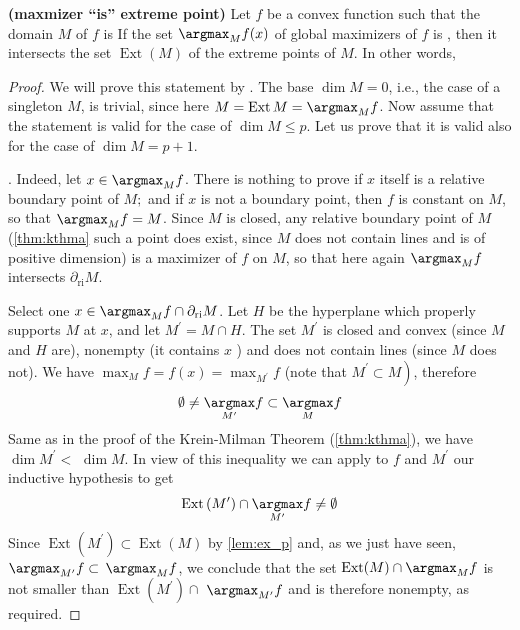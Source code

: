 \documentclass{article}
\newcommand{\bfs}[1]{\textbf{({#1}) }}
\newcommand{\rb}{\partial_{\mathrm{ri}}}
\begin{document}
\begin{thma}\bfs{maxmizer ``is'' extreme point}
Let $f$ be a convex function such that the domain $M$ of $f$ is  If the set $\argmax_M f(x)$ of global maximizers of $f$ is , then it intersects the set $\operatorname{Ext}(M)$ of the extreme points of $M$. In other words, 
\end{thma}
\begin{proof}\color{ForestGreen}
We will prove this statement by . The base $\operatorname{dim} M=0$, i.e., the case of a singleton $M$, is trivial, since here $M=\operatorname{Ext} M=\argmax_{M} f$. Now assume that the statement is valid for the case of $\operatorname{dim} M \leq p$. Let us prove that it is valid also for the case of $\operatorname{dim} M=p+1$.

\tb{We first verify that the set $\argmax_{M} f\cap \rb M\ne\emptyset$}. Indeed, let $x \in \argmax_{M} f$. There is nothing to prove if $x$ itself is a relative boundary point of $M ;$ and if $x$ is not a boundary point, then $f$ is constant on $M$, so that $\argmax_{M} f=M$. Since $M$ is closed, any relative boundary point of $M$ (\cref{thm:kthma} such a point does exist, since $M$ does not contain lines and is of positive dimension) is a maximizer of $f$ on $M$, so that here again $\argmax_{M} f$ intersects $\partial_{\mathrm{ri}} M$.

 Select one $x\in \argmax_{M} f\cap \rb M$. Let $H$ be the hyperplane which properly supports $M$ at $x$, and let $M^{\prime}=M \cap H$. The set $M^{\prime}$ is closed and convex (since $M$ and $H$ are), nonempty (it contains $x$ ) and does not contain lines (since $M$ does not). We have $\max _{M} f=f(x)=\max _{M^{\prime}} f$ (note that $\left.M^{\prime} \subset M\right)$, therefore
\begin{align*}
\emptyset \neq \underset{M^{\prime}}{\argmax} f \subset \underset{M}{\argmax} f
\end{align*}
Same as in the proof of the Krein-Milman Theorem (\cref{thm:kthma}), we have $\operatorname{dim} M^{\prime}<$ $\operatorname{dim} M$. In view of this inequality we can apply to $f$ and $M^{\prime}$ our inductive hypothesis to get
\begin{align*}
\operatorname{Ext}\left(M^{\prime}\right) \cap \underset{M^{\prime}}{\argmax} f \neq \emptyset
\end{align*}
Since $\operatorname{Ext}\left(M^{\prime}\right) \subset \operatorname{Ext}(M)$ by \cref{lem:ex_p} and, as we just have seen, $\argmax_{M^{\prime}} f \subset$ $\argmax_{M} f$, we conclude that the set $\operatorname{Ext}(M) \cap \argmax_{M} f$ is not smaller than $\operatorname{Ext}\left(M^{\prime}\right) \cap$ $\argmax_{M^{\prime}} f$ and is therefore nonempty, as required.
\end{proof}
\end{document}
